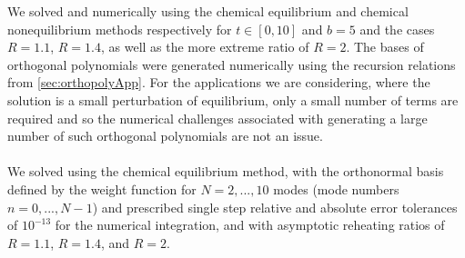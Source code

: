 We solved  and  numerically using the chemical equilibrium and chemical nonequilibrium methods respectively for $t\in[0,10]$ and $b=5$ and the cases $R=1.1$, $R=1.4$, as well as the more extreme ratio of $R=2$.  The bases of orthogonal polynomials were generated numerically using the recursion relations from \ref{sec:orthopolyApp}.  For the applications we are considering, where the solution is a small perturbation of equilibrium, only a small number of terms are required and so the numerical challenges associated with generating a large number of such orthogonal polynomials are not an issue.\\

\\
We solved  using the chemical equilibrium method, with the orthonormal basis defined by the weight function  for $N=2,...,10$ modes (mode numbers $n=0,...,N-1$) and prescribed  single step relative and absolute error tolerances of $10^{-13}$ for the numerical integration, and with asymptotic reheating ratios of $R=1.1$, $R=1.4$, and $R=2$.   



